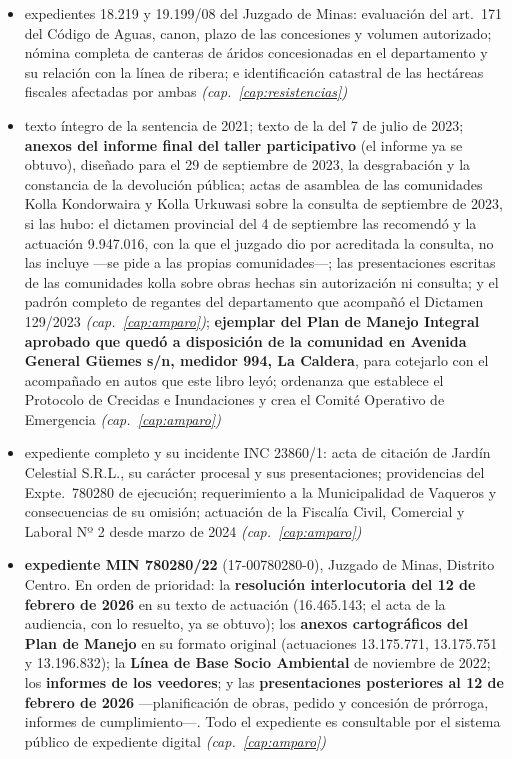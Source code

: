 \begin{itemize}[leftmargin=*]
\item expedientes 18.219 y 19.199/08 del Juzgado de Minas: evaluación del art.\ 171 del Código de Aguas, canon, plazo de las concesiones y volumen autorizado; nómina completa de canteras de áridos concesionadas en el departamento y su relación con la línea de ribera; e identificación catastral de las hectáreas fiscales afectadas por ambas \textit{(cap.\ \ref{cap:resistencias})}
\item texto íntegro de la sentencia de 2021; texto de la del 7 de julio de 2023; \textbf{anexos del informe final del taller participativo} (el informe ya se obtuvo), diseñado para el 29 de septiembre de 2023, la desgrabación y la constancia de la devolución pública; actas de asamblea de las comunidades Kolla Kondorwaira y Kolla Urkuwasi sobre la consulta de septiembre de 2023, si las hubo: el dictamen provincial del 4 de septiembre las recomendó y la actuación 9.947.016, con la que el juzgado dio por acreditada la consulta, no las incluye ---se pide a las propias comunidades---; las presentaciones escritas de las comunidades kolla sobre obras hechas sin autorización ni consulta; y el padrón completo de regantes del departamento que acompañó el Dictamen 129/2023 \textit{(cap.\ \ref{cap:amparo})}; \textbf{ejemplar del Plan de Manejo Integral aprobado que quedó a disposición de la comunidad en Avenida General Güemes s/n, medidor 994, La Caldera}, para cotejarlo con el acompañado en autos que este libro leyó; ordenanza que establece el Protocolo de Crecidas e Inundaciones y crea el Comité Operativo de Emergencia \textit{(cap.\ \ref{cap:amparo})}
\item expediente completo y su incidente INC 23860/1: acta de citación de Jardín Celestial S.R.L., su carácter procesal y sus presentaciones; providencias del Expte.\ 780280 de ejecución; requerimiento a la Municipalidad de Vaqueros y consecuencias de su omisión; actuación de la Fiscalía Civil, Comercial y Laboral Nº 2 desde marzo de 2024 \textit{(cap.\ \ref{cap:amparo})}
\item \textbf{expediente MIN 780280/22} (17-00780280-0), Juzgado de Minas, Distrito Centro. En orden de prioridad: la \textbf{resolución interlocutoria del 12 de febrero de 2026} en su texto de actuación (16.465.143; el acta de la audiencia, con lo resuelto, ya se obtuvo); los \textbf{anexos cartográficos del Plan de Manejo} en su formato original (actuaciones 13.175.771, 13.175.751 y 13.196.832); la \textbf{Línea de Base Socio Ambiental} de noviembre de 2022; los \textbf{informes de los veedores}; y las \textbf{presentaciones posteriores al 12 de febrero de 2026} ---planificación de obras, pedido y concesión de prórroga, informes de cumplimiento---. Todo el expediente es consultable por el sistema público de expediente digital \textit{(cap.\ \ref{cap:amparo})}

\end{itemize}
